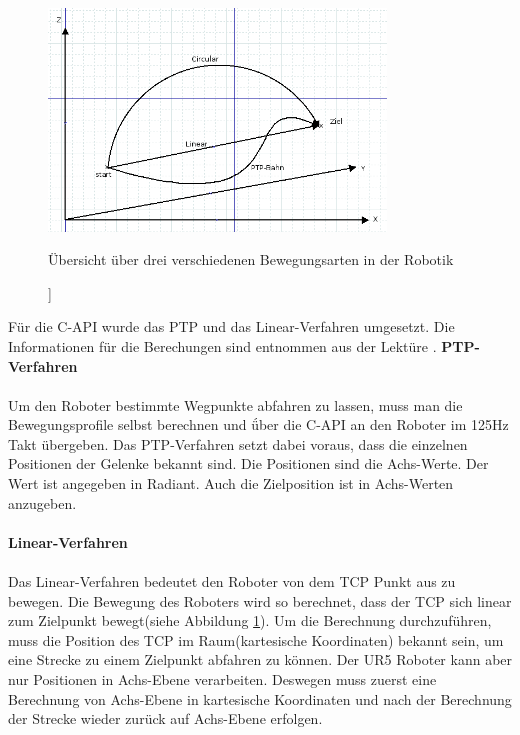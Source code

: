 \begin{figure}[H]
  \centering
    \includegraphics[width=0.8\textwidth]{pic/bewegungsarten.png}
      \caption[Bewegungsarten in Robotik]]{Übersicht über drei verschiedenen Bewegungsarten in der Robotik}
      \label{fig:bewegungsarten}
\end{figure}

Für die C-\ac{API} wurde das \ac{PTP} und das Linear-Verfahren umgesetzt. Die Informationen für die Berechungen sind entnommen aus der Lektüre \cite{WW-2013}.
\newpage
\textbf{\acs{PTP}-Verfahren}
\\\\
Um den Roboter bestimmte Wegpunkte abfahren zu lassen, muss man die Bewegungsprofile selbst berechnen und ǘber die C-API an den Roboter im 125Hz Takt übergeben. Das \ac{PTP}-Verfahren setzt dabei voraus, dass die einzelnen Positionen der Gelenke bekannt sind. Die Positionen sind die Achs-Werte. Der Wert ist angegeben in Radiant. Auch die Zielposition ist in Achs-Werten anzugeben.
\\\\
\textbf{Linear-Verfahren}
\\\\
Das Linear-Verfahren bedeutet den Roboter von dem \ac{TCP} Punkt aus zu bewegen. Die Bewegung des Roboters wird so berechnet, dass der \ac{TCP} sich linear zum Zielpunkt bewegt(siehe Abbildung \ref{fig:bewegungsarten}).
Um die Berechnung durchzuführen, muss die Position des \ac{TCP} im Raum(kartesische Koordinaten) bekannt sein, um eine Strecke zu einem Zielpunkt abfahren zu können. Der UR5 Roboter kann aber nur Positionen in Achs-Ebene verarbeiten. Deswegen muss zuerst eine Berechnung von Achs-Ebene in kartesische Koordinaten und nach der Berechnung der Strecke wieder zurück auf Achs-Ebene erfolgen.

